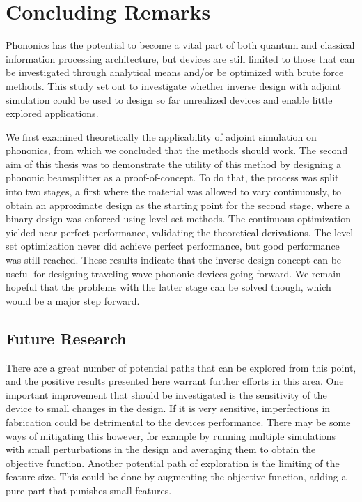 \chapter{Concluding Remarks}

Phononics has the potential to become a vital part of both quantum and
classical information processing architecture, but devices are still limited to
those that can be investigated through analytical means and/or be optimized with
brute force methods. This study set out to investigate whether inverse design
with adjoint simulation could be used to design so far unrealized devices and
enable little explored applications.

We first examined theoretically the applicability of adjoint simulation on
phononics, from which we concluded that the methods should work.
The second aim of this thesis was to demonstrate the utility of this method by
designing a phononic beamsplitter as a proof-of-concept.
To do that, the process was split into two stages, a first where the material
was allowed to vary continuously, to obtain an approximate design as the
starting point for the second stage, where a binary design was
enforced using level-set methods.
The continuous optimization yielded near perfect performance, validating the
theoretical derivations.
The level-set optimization never did achieve perfect performance, but
good performance was still reached.
These results indicate that the inverse design concept can be useful for
designing traveling-wave phononic devices going forward.
We remain hopeful that the problems with the latter stage can be solved
though, which would be a major step forward.

\section{Future Research}

There are a great number of potential paths that can be explored from this
point, and the positive results presented here warrant further efforts in this
area.
One important improvement that should be investigated is the sensitivity of the
device to small changes in the design.
If it is very sensitive, imperfections in fabrication could be detrimental to
the devices performance.
There may be some ways of mitigating this however, for example by running
multiple simulations with small perturbations in the design and averaging them
to obtain the objective function.
Another potential path of exploration is the limiting of the feature size.
This could be done by augmenting the objective function, adding
a pure part that punishes small features.

